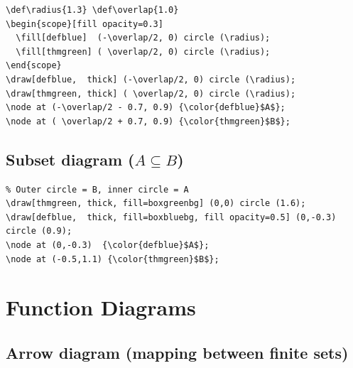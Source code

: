 \documentclass[11pt]{article}
\begin{document}
\begin{lstlisting}
\def\radius{1.3} \def\overlap{1.0}
\begin{scope}[fill opacity=0.3]
  \fill[defblue]  (-\overlap/2, 0) circle (\radius);
  \fill[thmgreen] ( \overlap/2, 0) circle (\radius);
\end{scope}
\draw[defblue,  thick] (-\overlap/2, 0) circle (\radius);
\draw[thmgreen, thick] ( \overlap/2, 0) circle (\radius);
\node at (-\overlap/2 - 0.7, 0.9) {\color{defblue}$A$};
\node at ( \overlap/2 + 0.7, 0.9) {\color{thmgreen}$B$};
\end{lstlisting}

\subsection{Subset diagram ($A \subseteq B$)}

\begin{center}
\end{center}

\begin{lstlisting}
% Outer circle = B, inner circle = A
\draw[thmgreen, thick, fill=boxgreenbg] (0,0) circle (1.6);
\draw[defblue,  thick, fill=boxbluebg, fill opacity=0.5] (0,-0.3) circle (0.9);
\node at (0,-0.3)  {\color{defblue}$A$};
\node at (-0.5,1.1) {\color{thmgreen}$B$};
\end{lstlisting}

\section{Function Diagrams}

\subsection{Arrow diagram (mapping between finite sets)}
\end{document}
